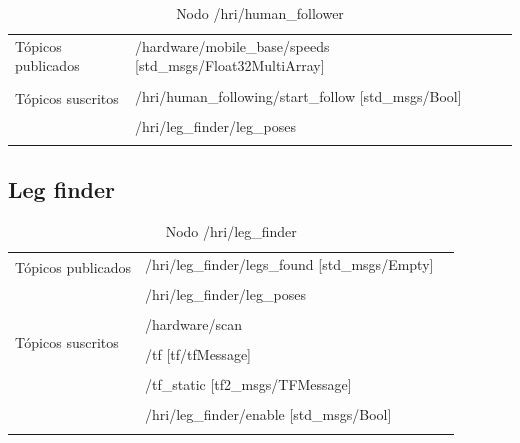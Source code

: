 \documentclass[a4paper,usenames,dvipsnames,svgnames,table]{book}
\begin{document}
\begin{table}[H]
\begin{center}
\begin{tabular}{|l|p{6cm}|p{5cm}|}%
\hline

Tópicos publicados
& /hardware/mobile\_base/speeds [std\_msgs/Float32MultiArray] &  \\
& & \\
\hline

\multirow{2}{*}{Tópicos suscritos}
& /hri/human\_following/start\_follow [std\_msgs/Bool] &  \\
& & \\
& /hri/leg\_finder/leg\_poses  &  \\
& & \\
\cline{1-3}

\end{tabular}
\caption{Nodo /hri/human\_follower}
\label{human follower node}
\end{center}
\end{table}

\subsection{Leg finder}

\begin{table}[H]
\begin{center}
\begin{tabular}{|l|p{6cm}|p{5cm}|}%
\hline

\multirow{2}{*}{Tópicos publicados}
& /hri/leg\_finder/legs\_found [std\_msgs/Empty] &  \\
& & \\
& /hri/leg\_finder/leg\_poses  &  \\
& & \\
\cline{1-3}

\multirow{4}{*}{Tópicos suscritos}
& /hardware/scan  &  \\
& & \\
& /tf [tf/tfMessage] &  \\
& & \\
& /tf\_static [tf2\_msgs/TFMessage] &  \\
& & \\
& /hri/leg\_finder/enable [std\_msgs/Bool]  &  \\
& & \\
\cline{1-3}

\end{tabular}
\caption{Nodo /hri/leg\_finder}
\label{leg finder node}
\end{center}
\end{table}
\end{document}
